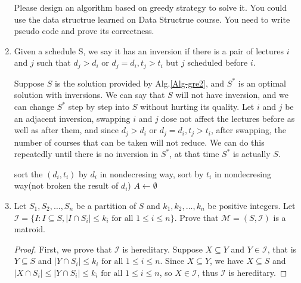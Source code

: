 \documentclass[12pt,a4paper]{article}
\makeatletter
\newtheorem*{solution}{Solution}
\theoremstyle{definition}
\renewenvironment{solution}[1][Solution] {\par\pushQED{\qed}\normalfont\topsep6\p@\@plus6\p@\relax\trivlist\item[\hskip\labelsep\bfseries#1\@addpunct{.}]\ignorespaces}{\popQED\endtrivlist\@endpefalse} \makeatother
\makeatother
\begin{document}
\begin{enumerate}
    Please design an algorithm based on greedy strategy to solve it. You could use the data structrue learned on Data Structrue course. You need to write pseudo code and prove its correctness.

    \begin{solution}
    	 Given a schedule S, we say it has an inversion if there is a pair of lectures $i$ and $j$ such that $d_j > d_i$ or $d_j = d_i, t_j > t_i$ but $j$ scheduled before $i$.
    	 
    	 Suppose $S$ is the solution provided by Alg.\ref{Alg-gre2}, and $S^{*}$ is an optimal solution with inversions. We can say that $S$ will not have inversion, and we can change $S^{*}$ step by step into $S$ without hurting its quality. Let $i$ and $j$ be an adjacent inversion, swapping $i$ and $j$ dose not affect the lectures before as well as after them, and since $d_j > d_i$ or $d_j = d_i, t_j > t_i$, after swapping, the number of courses that can be taken will not reduce. We can do this repeatedly until there is no inversion in $S^{*}$, at that time $S^{*}$ is actually $S$.
    	 \\
        \begin{minipage}[t]{0.7\textwidth}
        	\centering
        	\begin{algorithm}[H]
        		\BlankLine
        		\caption{$greedy2$} \label{Alg-gre2}
        		sort the $(d_i,t_i)$ by $d_i$ in nondecresing way, sort by $t_i$ in nondecresing way(not broken the result of $d_i$)\;
        		$A \leftarrow \emptyset$\;
        		\;
        	\end{algorithm}
        \end{minipage}
    \end{solution}

    \item
    Let $S_1,S_2,\dots,S_n$ be a partition of $S$ and $k_1,k_2,\dots,k_n$ be positive integers. Let $\mathcal{I}=\{I: I \subseteq S,|I \cap S_i| \leq k_i \text { for all } 1 \leq i \leq n\}$. Prove that $\mathcal{M}=(S,\mathcal{I})$ is a matroid.

    \begin{proof}
        First, we prove that $\mathcal{I}$ is hereditary. Suppose $X \subseteq Y$ and $Y \in \mathcal{I}$, that is $Y \subseteq S $ and $|Y \cap S_i| \leq k_i \text { for all } 1 \leq i \leq n$. Since $X \subseteq Y$, we have $X \subseteq S $ and $|X \cap S_i| \leq |Y \cap S_i| \leq k_i \text { for all } 1 \leq i \leq n$, so $X \in \mathcal{I}$, thus $\mathcal{I}$ is hereditary. 
        

\end{proof}
\end{enumerate}
\end{document}
